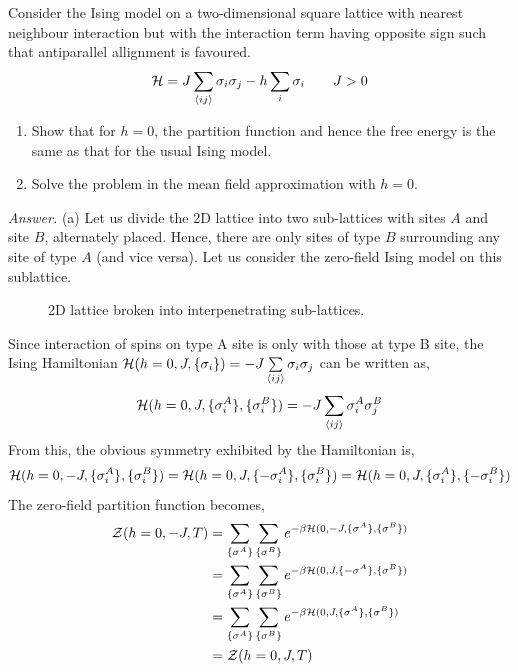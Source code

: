 \begin{question}
Consider the Ising model on a two-dimensional square lattice with nearest neighbour interaction but with the interaction term having opposite sign such that antiparallel allignment is favoured.
$$\mathcal H = J\sum\limits_{\left\langle ij \right\rangle} \sigma_i \sigma_j -h\sum\limits_i \sigma_i\qquad J>0$$
\begin{enumerate}
    \item[(a)] Show that for $h = 0$, the partition function and hence the free energy is the same as that for the usual Ising model.
    \item[(b)]  Solve the problem in the mean field approximation with $h = 0$.
\end{enumerate}
\end{question}
\noindent
\textit{Answer.} (a) Let us divide the 2D lattice into two sub-lattices with sites $A$ and site $B$, alternately placed. Hence, there are only sites of type $B$ surrounding any site of type $A$ (and vice versa). Let us consider the zero-field Ising model on this sublattice. 
\begin{figure}[H]
    \centering 
    
    \caption{2D lattice broken into interpenetrating sub-lattices.}
\end{figure}
\noindent 
Since interaction of spins on type A site  is only with those at type B site, the Ising Hamiltonian $\mathcal H(h=0, J, \{\sigma_i\}) = -J\sum\limits_{\left\langle ij \right\rangle}\sigma_i \sigma_j$ can be written as,
\begin{equation}
    \mathcal H(h=0, J,\{\sigma_i^A\},\{\sigma_i^B\} ) = -J\sum\limits_{\left\langle ij \right\rangle}\sigma_i^A \sigma_j^B
\end{equation}
From this, the obvious symmetry exhibited by the Hamiltonian is,
\begin{equation}\label{sublat}
    \mathcal H(h=0, -J,\{\sigma_i^A\},\{\sigma_i^B\} ) = \mathcal H(h=0, J,\{-\sigma_i^A\},\{\sigma_i^B\} ) = \mathcal H(h=0, J,\{\sigma_i^A\},\{-\sigma_i^B\} )
\end{equation}
The zero-field partition function becomes, 
\begin{align}
    \begin{split}
        \mathcal Z(h=0, -J, T) &= \sum\limits_{\{\sigma^A\}}\sum\limits_{\{\sigma^B\}} e^{-\beta \mathcal H(0, -J,\{\sigma^A\},\{\sigma^B\} )}\\
        &=\sum\limits_{\{\sigma^A\}}\sum\limits_{\{\sigma^B\}} e^{-\beta \mathcal H(0, J,\{ -\sigma^A\},\{\sigma^B\} )}\\
        &=\sum\limits_{\{\sigma^A\}}\sum\limits_{\{\sigma^B\}} e^{-\beta \mathcal H(0, J,\{\sigma^A\},\{\sigma^B\} )}\\
        &=\mathcal Z(h=0, J, T)
    \end{split}
\end{align}
